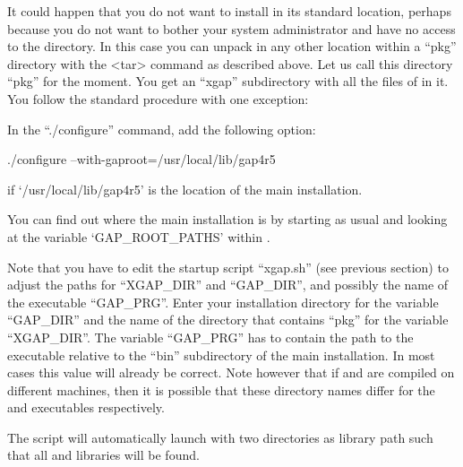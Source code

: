 It could happen that you do not want to install {\XGAP} in its
standard location, perhaps because you do not want to bother your
system administrator and have no access to the {\GAP} directory. In
this case you can unpack {\XGAP} in any other location within a
``pkg'' directory with the <tar> command as described above. Let us
call this directory ``pkg'' for the moment. You get an ``xgap''
subdirectory with all the files of {\XGAP} in it. You follow the
standard procedure with one exception:

In the ``./configure'' command, add the following option:

\begintt
./configure --with-gaproot=/usr/local/lib/gap4r5
\endtt

if `/usr/local/lib/gap4r5' is the location of the main {\GAP} installation.

You can find out where the main {} installation is by starting 
{\GAP} as usual and looking at the variable `GAP_ROOT_PATHS' 
within {\GAP}.

Note that you have to edit the startup script ``xgap.sh'' (see previous 
section) to
adjust the paths for ``XGAP_DIR'' and ``GAP_DIR'', and possibly the
name of the {\GAP} executable ``GAP_PRG''.  Enter your {\GAP}
installation directory for the variable ``GAP_DIR'' and the name of
the directory that contains ``pkg'' for the variable ``XGAP_DIR''. The 
variable ``GAP_PRG'' has to contain the path to the {\GAP} executable relative
to the ``bin'' subdirectory of the main {\GAP} installation. In most cases
this value will already be correct. Note however that if {\GAP} and {\XGAP} 
are compiled on different machines, then it is possible that these directory
names differ for the {\GAP} and {\XGAP} executables respectively. 

The script will automatically launch {\GAP} with two directories as
library path such that all {\GAP} and {\XGAP} libraries will be found.

